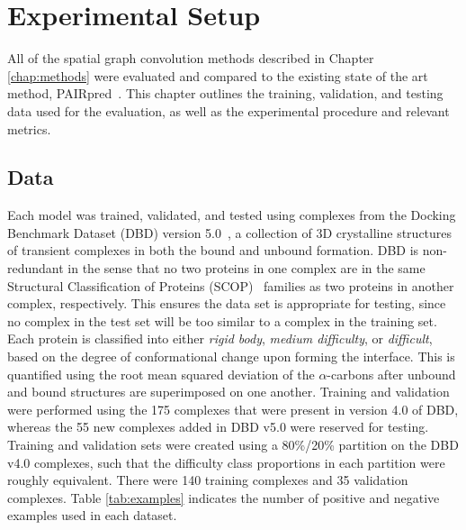 \chapter{Experimental Setup}
\label{chap:experiments}

All of the spatial graph convolution methods described in Chapter \ref{chap:methods} were evaluated and compared to the existing state of the art method, PAIRpred~\cite{minhas2014}.
This chapter outlines the training, validation, and testing data used for the evaluation, as well as the experimental procedure and relevant metrics.

\section{Data}

Each model was trained, validated, and tested using complexes from the Docking Benchmark Dataset (DBD) version 5.0~\cite{vreven2015}, a collection of 3D crystalline structures of transient complexes in both the bound and unbound formation. 
DBD is non-redundant in the sense that no two proteins in one complex are in the same Structural Classification of Proteins (SCOP)~\cite{murzin1995} families as two proteins in another complex, respectively.
This ensures the data set is appropriate for testing, since no complex in the test set will be too similar to a complex in the training set.
Each protein is classified into either \emph{rigid body}, \emph{medium difficulty}, or \emph{difficult}, based on the degree of conformational change upon forming the interface.
This is quantified using the root mean squared deviation of the $\alpha$-carbons after unbound and bound structures are superimposed on one another. 
Training and validation were performed using the 175 complexes that were present in version 4.0 of DBD, whereas the 55 new complexes added in DBD v5.0 were reserved for testing. 
Training and validation sets were created using a 80\%/20\% partition on the DBD v4.0 complexes, such that the difficulty class proportions in each partition were roughly equivalent.
There were 140 training complexes and 35 validation complexes.
Table \ref{tab:examples} indicates the number of positive and negative examples used in each dataset.

